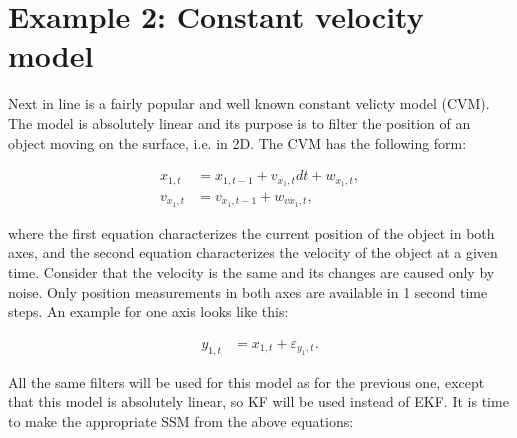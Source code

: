 \section{Example 2: Constant velocity model}
Next in line is a fairly popular and well known constant velicty model (CVM). The model is absolutely linear and its purpose is to filter the position of an object moving on the surface, i.e. in 2D. The CVM has the following form:

\begin{equation}
    \begin{aligned}
        x_{1,t} &= x_{1,t-1} + v_{x_1,t} dt + w_{x_1,t}, \\
        v_{x_1,t} &= v_{x_1, t-1} + w_{vx_1, t},
    \end{aligned}
    \label{eq:cvm_equations}
\end{equation}

\noindent where the first equation characterizes the current position of the object in both axes, and the second equation characterizes the velocity of the object at a given time. Consider that the velocity is the same and its changes are caused only by noise. Only position measurements in both axes are available in 1 second time steps. An example for one axis looks like this:

\begin{equation}
\begin{aligned}
    y_{1,t} &= x_{1,t} + \varepsilon_{y_1,t}.
\end{aligned}
\label{eq:cvm_measurement_equation}
\end{equation}

All the same filters will be used for this model as for the previous one, except that this model is absolutely linear, so KF will be used instead of EKF. It is time to make the appropriate SSM from the above equations:


